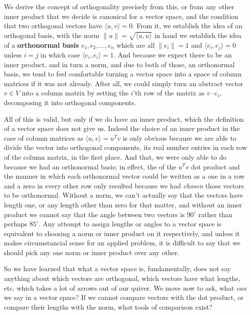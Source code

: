 \documentclass[11pt]{article}
\begin{document}
We derive the concept of orthogonality precisely from this, or from any other inner product that we decide is canonical for a vector space, and the condition that two orthogonal vectors have $\langle u, v \rangle = 0$. From it, we establish the idea of an orthogonal basis, with the norm $\lVert u \rVert = \sqrt{\langle u, u \rangle}$ in hand we establish the idea of a \textbf{orthonormal basis} $e_1,e_2, \dots, e_n$ which are all $\lVert e_i \rVert = 1$ and $\langle e_i, e_j \rangle = 0$ unless $i=j$ in which case $\langle e_i , e_i \rangle = 1$. And because we expect there to be an inner product, and in turn a norm, and due to both of those, an orthonormal basis, we tend to feel comfortable turning a vector space into a space of column matrices if it was not already. After all, we could simply turn an abstract vector $v \in V$ into a column matrix by setting the $i$'th row of the matrix as $v \cdot e_i$, decomposing it into orthogonal components.

All of this is valid, but only if we do have an inner product, which the definition of a vector space does not give us. Indeed the  choice of an inner product in the case of column matrices as $\langle u, v \rangle = u^T v$ is only obvious because we are able to divide the vector into orthogonal components, its real number entries in each row of the column matrix, in the first place. And that, we were only able to do because we had an orthonormal basis; in effect, the  of the $u^T v$ dot product and the manner in which each orthonormal vector could be written as a one in a row and a zero in every other row only resulted because we had \emph{chosen} those vectors to be orthonormal. Without a norm, we can't actually say that the vectors have length one, or any length other than zero for that matter, and without an inner product we cannot say that the angle between two vectors is $90^\circ$ rather than perhaps $85^\circ$. Any attempt to assign lengths or angles to a vector space is equivalent to choosing a norm or inner product on it respectively, and unless it makes circumstancial sense for an applied problem, it is difficult to say that we should pick any one norm or inner product over any other.

So we have learned that what a vector space is, fundamentally, does not say anything about which vectors are orthogonal, which vectors have what lengths, etc. which takes a lot of arrows out of our quiver. We move now to ask, what \emph{can} we say in a vector space? If we cannot compare vectors with the dot product, or compare their lengths with the norm, what tools of comparison exist?
\end{document}
